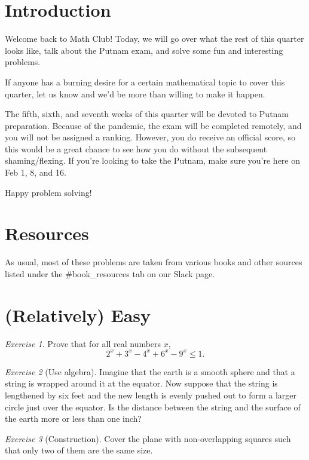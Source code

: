 \documentclass{article}
\theoremstyle{definition}
\theoremstyle{remark}
\newtheorem{exercise}{Exercise}
\begin{document}
\section{Introduction}

    Welcome back to Math Club! Today, we will go over what the rest of this quarter looks like, talk about the Putnam exam, and solve some fun and interesting problems.
    
    If anyone has a burning desire for a certain mathematical topic to cover this quarter, let us know and we'd be more than willing to make it happen.
    
    The fifth, sixth, and seventh weeks of this quarter will be devoted to Putnam preparation. Because of the pandemic, the exam will be completed remotely, and you will not be assigned a ranking. However, you do receive an official score, so this would be a great chance to see how you do without the subsequent shaming/flexing. If you're looking to take the Putnam, make sure you're here on Feb 1, 8, and 16.
    
    Happy problem solving!

\section{Resources}

    As usual, most of these problems are taken from various books and other sources listed under the \#book\_resources tab on our Slack page.
\section{(Relatively) Easy}

\begin{exercise}
Prove that for all real numbers $x$, 
\[2^x + 3^x - 4^x + 6^x - 9^x \leq 1.
\]
\end{exercise}

\begin{exercise}[Use algebra]
Imagine that the earth is a smooth sphere and that a string is wrapped around it at the equator. Now suppose that the string is lengthened by six feet and the new length is evenly pushed out to form a larger circle just over the equator. Is the distance between the string and the surface of the earth more or less than one inch?
\end{exercise}

\begin{exercise}[Construction]
Cover the plane with non-overlapping squares such that only two of them are the same size.
\end{exercise}
\end{document}

